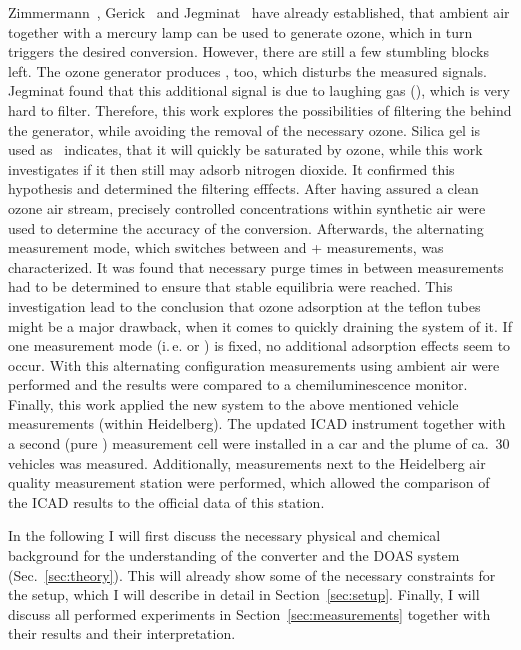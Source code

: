 Zimmermann~\cite{zimmermann}, Gerick~\cite{gerick} and
Jegminat~\cite{bsc} have already established, that ambient air
together with a mercury lamp can be used to generate ozone, which in
turn triggers the desired conversion. However, there are still a few
stumbling blocks left. The ozone generator produces , too,
which disturbs the measured  signals. Jegminat found that
this additional signal is due to laughing gas (), which is
very hard to filter. Therefore, this work explores the possibilities
of filtering the  behind the generator, while avoiding the
removal of the necessary ozone. Silica gel is used
as~\cite{ozone-silica} indicates, that it will quickly be saturated by
ozone, while this work investigates if it then still may adsorb
nitrogen dioxide. It confirmed this hypothesis and determined the
filtering efffects. After having assured a clean ozone air stream,
precisely controlled  concentrations within synthetic air were
used to determine the accuracy of the conversion. Afterwards, the
alternating measurement mode, which switches between  and
+ measurements, was characterized. It was found that
necessary purge times in between measurements had to be determined to
ensure that stable equilibria were reached. This investigation lead to
the conclusion that ozone adsorption at the teflon tubes might be a
major drawback, when it comes to quickly draining the system of it. If
one measurement mode (i.\,e.  or ) is fixed, no
additional adsorption effects seem to occur. With this alternating
configuration measurements using ambient air were performed and the
results were compared to a chemiluminescence monitor. Finally, this
work applied the new system to the above mentioned vehicle
measurements (within Heidelberg). The updated ICAD instrument together
with a second (pure ) measurement cell were installed in a car
and the plume of ca.~30 vehicles was measured. Additionally,
measurements next to the Heidelberg air quality measurement station
were performed, which allowed the comparison of the ICAD results to
the official data of this station.

In the following I will first discuss the necessary physical and
chemical background for the understanding of the converter and the
DOAS system (Sec.~\ref{sec:theory}). This will already show some of
the necessary constraints for the setup, which I will describe in
detail in Section~\ref{sec:setup}. Finally, I will discuss all
performed experiments in Section~\ref{sec:measurements} together with
their results and their interpretation.


